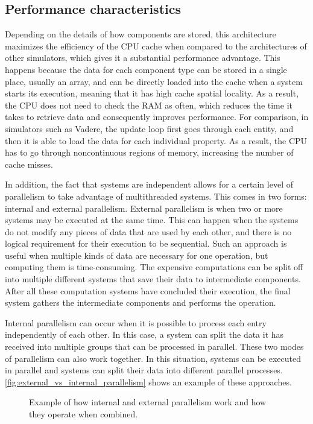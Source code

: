 \documentclass[twoside, 11pt]{article}
\begin{document}
\subsection{Performance characteristics}

Depending on the details of how components are stored, this architecture maximizes the efficiency of the CPU cache when compared to the architectures of other simulators, which gives it a substantial performance advantage. This happens because the data for each component type can be stored in a single place, usually an array, and can be directly loaded into the cache when a system starts its execution, meaning that it has high cache spatial locality. As a result, the CPU does not need to check the RAM as often, which reduces the time it takes to retrieve data and consequently improves performance. For comparison, in simulators such as Vadere, the update loop first goes through each entity, and then it is able to load the data for each individual property. As a result, the CPU has to go through noncontinuous regions of memory, increasing the number of cache misses.

In addition, the fact that systems are independent allows for a certain level of parallelism to take advantage of multithreaded systems. This comes in two forms: internal and external parallelism. External parallelism is when two or more systems may be executed at the same time. This can happen when the systems do not modify any pieces of data that are used by each other, and there is no logical requirement for their execution to be sequential. Such an approach is useful when multiple kinds of data are necessary for one operation, but computing them is time-consuming. The expensive computations can be split off into multiple different systems that save their data to intermediate components. After all these computation systems have concluded their execution, the final system gathers the intermediate components and performs the operation. 

Internal parallelism can occur when it is possible to process each entry independently of each other. In this case, a system can split the data it has received into multiple groups that can be processed in parallel. These two modes of parallelism can also work together. In this situation, systems can be executed in parallel and systems can split their data into different parallel processes. \autoref{fig:external_vs_internal_parallelism} shows an example of these approaches.

\begin{figure}
  \centering
  
  \caption[External and internal parallelism comparison]{Example of how internal and external parallelism work and how they operate when combined.}
  \label{fig:external_vs_internal_parallelism}
\end{figure}
\end{document}
